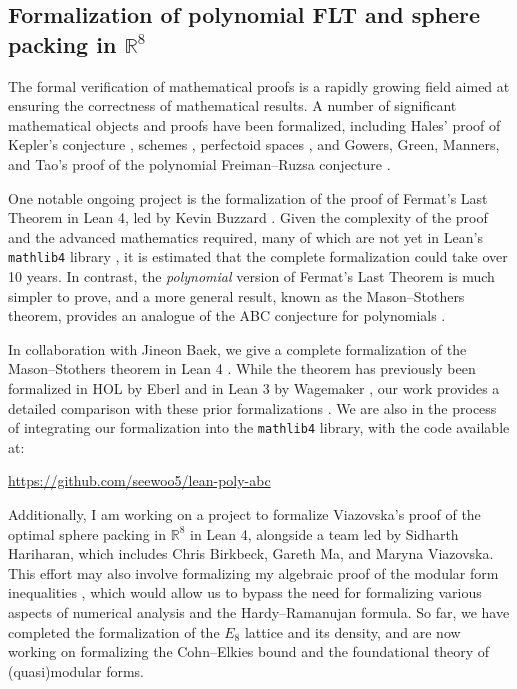 \documentclass[12pt]{article}
\begin{document}
\subsection*{Formalization of polynomial FLT and sphere packing in $\mathbb{R}^{8}$}

The formal verification of mathematical proofs is a rapidly growing field aimed at ensuring the correctness of mathematical results.
A number of significant mathematical objects and proofs have been formalized, including Hales' proof of Kepler's conjecture \cite{hales2017formal}, schemes \cite{buzzard2022schemes}, perfectoid spaces \cite{buzzard2020formalising}, and Gowers, Green, Manners, and Tao's proof of the polynomial Freiman--Ruzsa conjecture \cite{gowers2023conjecture,pfr}.

One notable ongoing project is the formalization of the proof of Fermat's Last Theorem in Lean 4, led by Kevin Buzzard \cite{fltlean4}.
Given the complexity of the proof and the advanced mathematics required, many of which are not yet in Lean's \texttt{mathlib4} library \cite{mathlib4}, it is estimated that the complete formalization could take over 10 years.
In contrast, the \emph{polynomial} version of Fermat's Last Theorem is much simpler to prove, and a more general result, known as the Mason--Stothers theorem, provides an analogue of the ABC conjecture for polynomials \cite{stothers81,mason84}.

In collaboration with Jineon Baek, we give a complete formalization of the Mason--Stothers theorem in Lean 4 \cite{baek2024formalizing}.
While the theorem has previously been formalized in HOL by Eberl \cite{eberl17} and in Lean 3 by Wagemaker \cite{wagemaker18}, our work provides a detailed comparison with these prior formalizations \cite[Section 7]{baek2024formalizing}.
We are also in the process of integrating our formalization into the \texttt{mathlib4} library, with the code available at:

\begin{center} \href{https://github.com/seewoo5/lean-poly-abc}{https://github.com/seewoo5/lean-poly-abc} \end{center}


Additionally, I am working on a project to formalize Viazovska's proof of the optimal sphere packing in $\mathbb{R}^{8}$ \cite{viazovska2017sphere} in Lean 4, alongside a team led by Sidharth Hariharan, which includes Chris Birkbeck, Gareth Ma, and Maryna Viazovska.
This effort may also involve formalizing my algebraic proof of the modular form inequalities \cite{lee2024algebraic}, which would allow us to bypass the need for formalizing various aspects of numerical analysis and the Hardy--Ramanujan formula.
So far, we have completed the formalization of the $E_8$ lattice and its density, and are now working on formalizing the Cohn--Elkies bound and the foundational theory of (quasi)modular forms.
\end{document}
